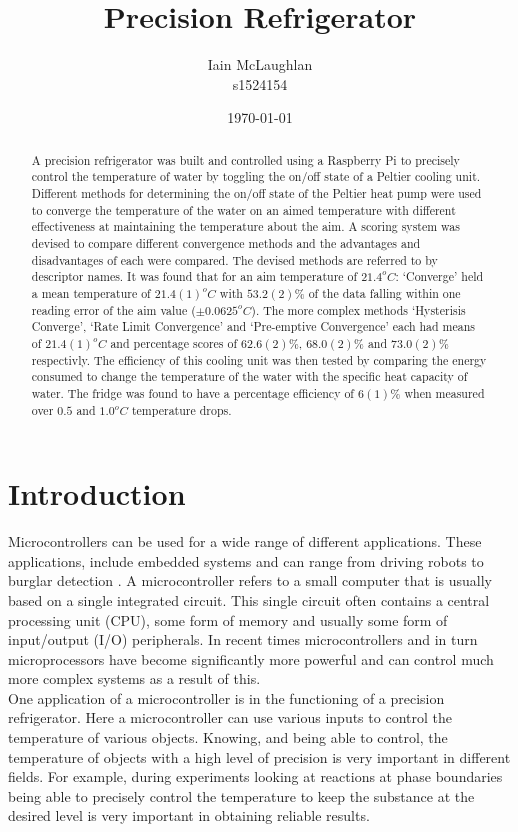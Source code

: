\documentclass[10pt]{article}
\title{Precision Refrigerator}
\author{Iain McLaughlan\\ s1524154 }
\date{\today}
\begin{document}
\maketitle
\begin{abstract}
A precision refrigerator was built and controlled using a Raspberry Pi to precisely control the temperature of water by toggling the on/off state of a Peltier \cite{peltier}\cite{pelt} cooling unit. Different methods for determining the on/off state of the Peltier heat pump were used to converge the temperature of the water on an aimed temperature with different effectiveness at maintaining the temperature about the aim. A scoring system was devised to compare different convergence methods and the advantages and disadvantages of each were compared. The devised methods are referred to by descriptor names. It was found that for an aim temperature of $21.4^oC$: `Converge' held a mean temperature of $21.4(1)^oC$ with $53.2(2)\%$ of the data falling within one reading error of the aim value ($\pm 0.0625^oC$). The more complex methods `Hysterisis Converge', `Rate Limit Convergence' and `Pre-emptive Convergence' each had means of $21.4(1)^oC$ and percentage scores of $62.6(2)\%$, $68.0(2)\%$ and $73.0(2)\%$ respectivly. The efficiency of this cooling unit was then tested by comparing the energy consumed to change the temperature of the water with the specific heat capacity of water. The fridge was found to have a percentage efficiency of $6(1)\%$ when measured over $0.5$ and $1.0^oC$ temperature drops.
\end{abstract}

\section*{Introduction}
Microcontrollers can be used for a wide range of different applications. These applications, include embedded systems and can range from driving robots \cite{robomicro} to burglar detection \cite{microburg}. A microcontroller refers to a small computer that is usually based on a single integrated circuit. This single circuit often contains a central processing unit (CPU), some form of memory and usually some form of input/output (I/O) peripherals. In recent times microcontrollers and in turn microprocessors have become significantly more powerful and can control much more complex systems as a result of this.\\

One application of a microcontroller is in the functioning of a precision refrigerator. Here a microcontroller can use various inputs to control the temperature of various objects. Knowing, and being able to control, the temperature of objects with a high level of precision is very important in different fields. For example, during experiments looking at reactions at phase boundaries \cite{microfluidic} being able to precisely control the temperature to keep the substance at the desired level is very important in obtaining reliable results.\\
\end{document}
